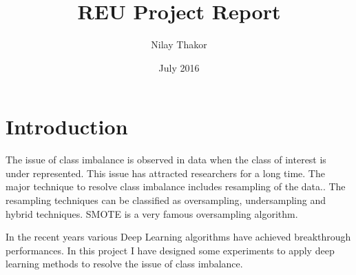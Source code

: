 \documentclass[a4paper,11pt]{report}
\title{REU Project Report}
\author{Nilay Thakor}
\date{July 2016}
\begin{document}




\chapter*{Introduction}

The issue of class imbalance is observed in data when the class of interest is under represented. This issue has attracted researchers for a long time. The major technique to resolve class imbalance includes resampling of the data.\cite{chawla2009data}. The resampling techniques can be classified as oversampling, undersampling and hybrid techniques. SMOTE\cite{chawla2002smote} is a very famous oversampling algorithm. 

In the recent years various Deep Learning algorithms have achieved breakthrough performances. In this project I have designed some experiments to apply deep learning methods to resolve the issue of class imbalance. 
\end{document}
